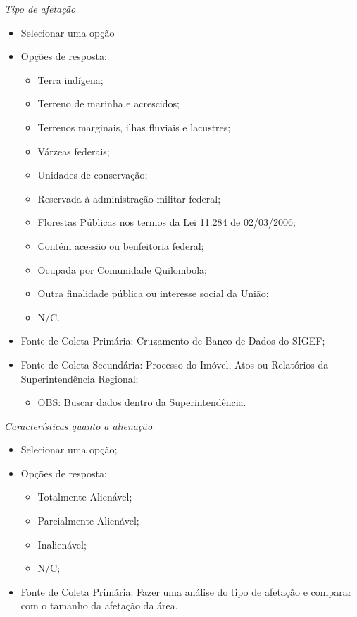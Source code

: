 \documentclass[
  letterpaper,
]{report}
\providecommand{\tightlist}{%
  \setlength{\itemsep}{0pt}\setlength{\parskip}{0pt}}\usepackage{longtable,booktabs,array}
\begin{document}
\emph{Tipo de afetação}

\begin{itemize}
\tightlist
\item
  Selecionar uma opção
\item
  Opções de resposta:

  \begin{itemize}
  \tightlist
  \item
    Terra indígena;
  \item
    Terreno de marinha e acrescidos;
  \item
    Terrenos marginais, ilhas fluviais e lacustres;
  \item
    Várzeas federais;
  \item
    Unidades de conservação;
  \item
    Reservada à administração militar federal;
  \item
    Florestas Públicas nos termos da Lei 11.284 de 02/03/2006;
  \item
    Contém acessão ou benfeitoria federal;
  \item
    Ocupada por Comunidade Quilombola;
  \item
    Outra finalidade pública ou interesse social da União;
  \item
    N/C.
  \end{itemize}
\item
  Fonte de Coleta Primária: Cruzamento de Banco de Dados do SIGEF;
\item
  Fonte de Coleta Secundária: Processo do Imóvel, Atos ou Relatórios da
  Superintendência Regional;

  \begin{itemize}
  \tightlist
  \item
    OBS: Buscar dados dentro da Superintendência.
  \end{itemize}
\end{itemize}

\emph{Características quanto a alienação}

\begin{itemize}
\tightlist
\item
  Selecionar uma opção;
\item
  Opções de resposta:

  \begin{itemize}
  \tightlist
  \item
    Totalmente Alienável;
  \item
    Parcialmente Alienável;
  \item
    Inalienável;
  \item
    N/C;
  \end{itemize}
\item
  Fonte de Coleta Primária: Fazer uma análise do tipo de afetação e
  comparar com o tamanho da afetação da área.
\end{itemize}
\end{document}
